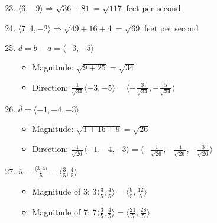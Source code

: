 \begin{enumerate}
    \setcounter{enumi}{22}

  \item $\langle 6, -9 \rangle \Rightarrow \sqrt{36 + 81} = \sqrt{117}$ feet per second

  \item $\langle 7, 4, -2 \rangle \Rightarrow \sqrt{49 + 16 + 4} = \sqrt{69}$ feet per second

    \setcounter{enumi}{26}

  \item $\overline{d} = b - a = \langle -3, -5 \rangle$
    
    \begin{itemize}

      \item Magnitude: $\sqrt{9 + 25} = \sqrt{34}$

      \item Direction: $\frac{1}{\sqrt{34}}\langle -3, -5 \rangle=\langle -\frac{3}{\sqrt{34}}, -\frac{5}{\sqrt{34}} \rangle$

    \end{itemize}

    \setcounter{enumi}{28}

  \item $\overline{d} = \langle -1, -4, -3 \rangle$

    \begin{itemize}

      \item Magnitude: $\sqrt{1 + 16 + 9} = \sqrt{26}$

      \item Direction: $\frac{1}{\sqrt{26}}\langle -1, -4, -3 \rangle = \langle -\frac{1}{\sqrt{26}}, -\frac{4}{\sqrt{26}}, -\frac{3}{\sqrt{26}} \rangle$

     \end{itemize}

    \setcounter{enumi}{32}

  \item $\overline{u} = \frac{\langle 3, 4 \rangle}{5} = \langle \frac{3}{5}, \frac{4}{5} \rangle$

    \begin{itemize}

      \item Magnitude of 3: $3\langle \frac{3}{5}, \frac{4}{5} \rangle = \langle \frac{9}{5}, \frac{12}{5} \rangle$

      \item Magnitude of 7: $7\langle \frac{3}{5}, \frac{4}{5} \rangle = \langle \frac{21}{5}, \frac{28}{5} \rangle$


\end{itemize}
\end{enumerate}
